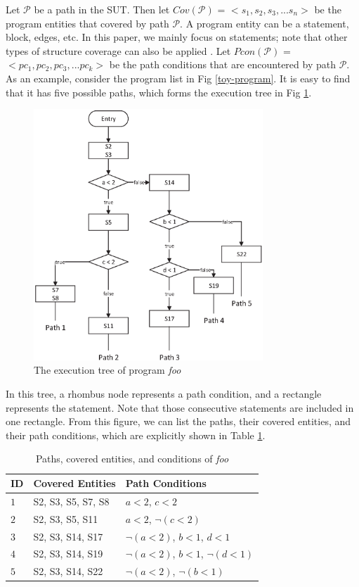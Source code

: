 \documentclass{sig-alternate-05-2015}
\begin{document}
Let $\mathcal{P}$ be a path in the SUT. Then let $Cov(\mathcal{P})$ = $< s_{1}, s_{2}, s_{3},... s_{n} >$ be the program entities that covered by path $\mathcal{P}$. A program entity can be a statement, block, edges, etc. In this paper, we mainly focus on statements; note that other types of structure coverage can also be applied \cite{song2012itree}. Let $Pcon(\mathcal{P})$ = $<pc_{1}, pc_{2}, pc_{3}, ... pc_{k}>$ be the path conditions that are encountered by path $\mathcal{P}$.  As an example, consider the program list in Fig \ref{toy-program}. It is easy to find that it has five possible paths, which forms the execution tree in Fig \ref{foo-tree}.

\begin{figure}
 \includegraphics[width=3.4in]{foo_tree.eps}
\caption{The execution tree of program \emph{foo}}
\label{foo-tree}
\end{figure}

In this tree, a rhombus node represents a path condition, and a rectangle represents the statement. Note that those consecutive statements are included in one rectangle. From this figure, we can list the paths, their covered entities, and their path conditions, which are explicitly shown in Table \ref{cov-con-foo}.

\begin{table}[ht]
\caption{Paths, covered entities, and conditions of \emph{foo}}
\label{cov-con-foo}
\center
\begin{tabular}{lll}
 \hline
\bfseries ID & \bfseries Covered Entities & \bfseries Path Conditions \\  \hline
 $1$ & S2, S3, S5, S7, S8& $a < 2$,  $c < 2$\\
 $2$ & S2, S3, S5, S11 & $a < 2$,  $\neg (c < 2)$\\
 $3$ & S2, S3, S14, S17& $\neg (a < 2)$,  $b < 1$, $d < 1$\\
 $4$ & S2, S3, S14, S19& $\neg (a < 2)$,  $b < 1$, $\neg (d < 1)$\\
 $5$ & S2, S3, S14, S22& $\neg (a < 2)$,  $\neg (b < 1)$\\
 \hline
\end{tabular}
\end{table}
\end{document}
